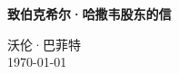 \documentclass[12pt, a4paper, UTF8, fontset=adobe, oneside]{ctexbook} %
\begin{document}
\frontmatter
\begin{titlepage}
\begin{center}

\vspace*{5cm}
{\huge \bfseries 致伯克希尔·哈撒韦股东的信}\\[0.4cm]

\vspace{12cm}

{\large 沃伦·巴菲特} \\[1cm]
{\large \today}

\end{center}
\end{titlepage}

{
\hypersetup{linkcolor=black} %
\tableofcontents %
}

\mainmatter%





\end{document}
